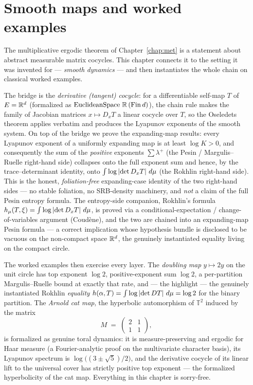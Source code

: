 \chapter{Smooth maps and worked examples}
\label{chap:examples}

The multiplicative ergodic theorem of Chapter~\ref{chap:met} is a statement about abstract
measurable matrix cocycles. This chapter connects it to the setting it was invented for ---
\emph{smooth dynamics} --- and then instantiates the whole chain on classical worked examples.

The bridge is the \emph{derivative (tangent) cocycle}: for a differentiable self-map \(T\) of
\(E = \mathbb{R}^d\) (formalized as \(\operatorname{EuclideanSpace}\,\mathbb{R}\,(\operatorname{Fin} d)\)), the chain rule makes
the family of Jacobian matrices \(x\mapsto D_xT\) a linear cocycle over \(T\), so the Oseledets
theorem applies verbatim and produces the Lyapunov exponents of the smooth system. On top of the
bridge we prove the expanding-map results: every Lyapunov exponent of a uniformly expanding map is
at least \(\log K > 0\), and consequently the sum of the \emph{positive} exponents
\(\sum\lambda^{+}\) (the Pesin / Margulis--Ruelle right-hand side) collapses onto the full exponent
sum and hence, by the trace--determinant identity, onto \(\int\log\left\lvert \det D_xT \right\rvert\,d\mu\) (the
Rokhlin right-hand side). This is the honest, \emph{foliation-free} expanding-case identity of the
two right-hand sides --- no stable foliation, no SRB-density machinery, and \emph{not} a claim of
the full Pesin entropy formula. The entropy-side companion, Rokhlin's formula
\(h_\mu(T,\xi) = \int\log\left\lvert \det D_xT \right\rvert\,d\mu\), is proved via a conditional-expectation /
change-of-variables argument (Coud\`ene), and the two are chained into an expanding-map Pesin
formula --- a correct implication whose hypothesis bundle is disclosed to be vacuous on the
non-compact space \(\mathbb{R}^d\), the genuinely instantiated equality living on the compact circle.

The worked examples then exercise every layer. The \emph{doubling map} \(y\mapsto 2y\) on the unit
circle has top exponent \(\log 2\), positive-exponent sum \(\log 2\), a per-partition
Margulis--Ruelle bound at exactly that rate, and --- the highlight --- the genuinely instantiated
Rokhlin \emph{equality} \(h(\alpha,T) = \int\log\left\lvert \det DT \right\rvert\,d\mu = \log 2\) for the binary
partition. The \emph{Arnold cat map}, the hyperbolic automorphism of \(\mathbb{T}^2\) induced by
the matrix
\[
  M \;=\; \begin{pmatrix} 2 & 1 \\ 1 & 1 \end{pmatrix},
\]
is formalized as genuine toral dynamics: it
is measure-preserving and ergodic for Haar measure (a Fourier-analytic proof on the multivariate
character basis), its Lyapunov spectrum is \(\log\bigl((3\pm\sqrt5)/2\bigr)\), and the derivative
cocycle of its linear lift to the universal cover has strictly positive top exponent --- the
formalized hyperbolicity of the cat map. Everything in this chapter is sorry-free.

